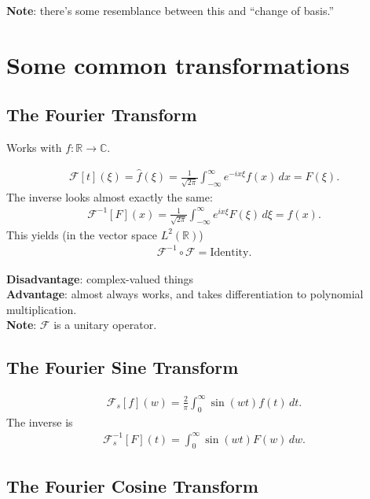 \documentclass{book}
\theoremstyle{definition}
\newcommand{\R}{\mathbb{R}}
\newcommand{\F}{\mathcal{F}}
\begin{document}
\textbf{Note}: there's some resemblance between this and ``change of basis.''\\

\section{Some common transformations}


\subsection{The Fourier Transform}

Works with $f:\R \to \mathbb{C}$.


\begin{align*}
\F[t](\xi) = \hat{f}(\xi) = \frac{1}{\sqrt{2\pi}}\int^\infty_{-\infty} e^{-ix\xi}f(x)\,dx = F(\xi).
\end{align*}
The inverse looks almost exactly the same:
\begin{align*}
\F^{-1}[F](x) = \frac{1}{\sqrt{2\pi}}\int^\infty_{-\infty} e^{ix\xi}F(\xi)\,d\xi = f(x).
\end{align*}
This yields (in the vector space $L^2(\R)$)
\begin{align*}
\F^{-1}\circ \F = \text{Identity}.
\end{align*}

\textbf{Disadvantage}: complex-valued things\\

\textbf{Advantage}: almost always works, and takes differentiation to polynomial multiplication.\\

\textbf{Note}: $\F$ is a unitary operator.

\subsection{The Fourier Sine Transform}

\begin{align*}
\F_s[f](w) = \frac{2}{\pi}\int^\infty_{0}\sin(wt)f(t)\,dt.
\end{align*}
The inverse is
\begin{align*}
\F^{-1}_s[F](t) = \int_{0}^\infty\sin(wt)F(w)\,dw.
\end{align*}

\subsection{The Fourier Cosine Transform}
\end{document}
